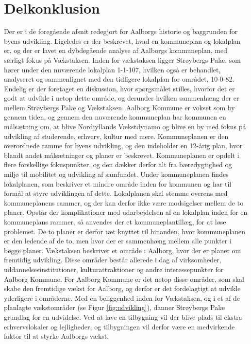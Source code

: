 \section{Delkonklusion}
Der er i de foregående afsnit redegjort for Aalborgs historie og baggrunden for byens udvikling. Ligeledes er der beskrevet, hvad en kommuneplan og lokalplan er, og der er lavet en dybdegående analyse af Aalborgs kommuneplan, med særligt fokus på Vækstaksen. Inden for vækstaksen ligger Strøybergs Palæ, som hører under den nuværende lokalplan 1-1-107, hvilken også er behandlet, analyseret og sammenlignet med den tidligere lokalplan for området, 10-0-82. Endelig er der foretaget en diskussion, hvor spørgsmålet stilles, hvorfor det er godt at udvikle i netop dette område, og derunder hvilken sammenhæng der er mellem Strøybergs Palæ og Vækstaksen.
\newline
\newline
Aalborg Kommune er vokset som by gennem tiden, og gennem den nuværende kommuneplan har kommunen en målsætning om, at blive Nordjyllands Vækstdynamo og blive en by med fokus på udvikling af studerende, erhverv, kultur med mere. 
\newline \indent{     }  Kommuneplanen er den overordnede ramme for byens udvikling, og den indeholder en 12-årig plan, hvor blandt andet målsætninger og planer er beskrevet. Kommuneplanen er opdelt i flere forskellige fokuspunkter, og den dækker derfor alt fra bæredygtighed og miljø til mobilitet og udvikling af samfundet. 
\newline \indent{     }  Under kommuneplanen findes lokalplanen, som beskriver et mindre område inden for kommunen og har til formål at styre udviklingen af dette. Lokalplanen skal stemme overens med kommuneplanens rammer, og der kan derfor ikke være modsigelser mellem de to planer. Opstår der komplikationer med udarbejdelsen af en lokalplan inden for en kommuneplans rammer, så anvendes der et kommuneplantillæg, for at løse problemet. De to planer er derfor tæt knyttet til hinanden, hvor kommuneplanen er den ledende af de to, men hvor der er sammenhæng mellem alle punkter i begge planer.
\newline
\newline
Vækstaksen beskriver et område i Aalborg, hvor der er planer om fremtidig udvikling. Disse områder består allerede i dag af virksomheder, uddannelsesinstitutioner, kulturattraktioner og andre interessepunkter for Aalborg Kommune. For Aalborg Kommune er det netop disse områder, som skal skabe den fremtidige vækst for Aalborg, og derfor er det fordelagtigt at udvikle yderligere i områderne. 
\newline \indent{     }  Med en beliggenhed inden for Vækstaksen, og i et af de planlagte vækstområder (se Figur \ref{fig:udvikling}), danner Strøybergs Palæ grundlag for en udvidelse. Ved at lave en tilbygning vil der blive plads til ekstra erhvervslokaler og lejligheder, og tilbygningen vil derfor være en medvirkende faktor til at styrke Aalborgs vækst.